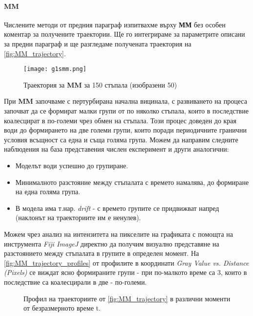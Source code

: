 \paragraph{MM} Числените методи от предния параграф изпитвахме върху \textbf{ММ} без особен коментар за получените траектории. Ще го интегрираме за параметрите описани за предни параграф и ще разгледаме получената траектория на \autoref{fig:MM_trajectory}.
\begin{figure}[htbp]
	\centering
	\texttt{[image: g1smm.png]}
	\caption{Траектория за \textbf{MM} за 150 стъпала (изобразени 50)}
	\label{fig:MM_trajectory}
\end{figure}
При \textbf{MM} започваме с пертурбирана начална вицинала, с развиването на процеса започват да се формират малки групи от по няколко стъпала, които в последствие коалесцират в по-големи чрез обмен на стъпала. Този процес доведен до края води до формирането на две големи групи, които поради периодичните гранични условия всъщност са една и съща голяма група. Можем да направим следните наблюдения на база представения числен експеримент и други аналогични: 
\begin{itemize}
    \item Моделът води успешно до групиране.
    \item Минималното разстояние между стъпалата с времето намалява, до формиране на една голяма група.
    \item В модела има т.нар. \textit{drift} - с времето групите се придвижват напред (наклонът на траекториите им е ненулев).
\end{itemize}
Можем чрез анализ на интензитета на пикселите на графиката с помощта на инструмента \textit{Fiji ImageJ} директно да получим визуално представяне на разстоянието между стъпалата в групите в определен момент. На \autoref{fig:MM_trajectory_profiles} от профилите в координати \textit{Gray Value vs. Distance (Pixels)} се виждат ясно формираните групи - при по-малкото време са 3, които в последствие са коалесцирали в две - по-големи.
\begin{figure}[hbpt]
    \centering
    \caption{Профил на траекториите от \autoref{fig:MM_trajectory} в различни моменти от безразмерното време t.}
    \label{fig:MM_trajectory_profiles}
\end{figure}

